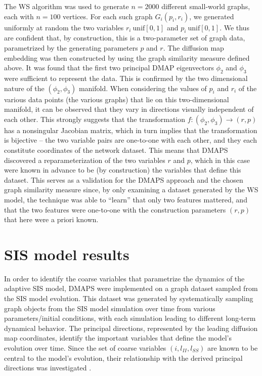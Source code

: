 The WS algorithm was used to generate $n=2000$ different small-world
graphs, each with $n=100$ vertices. For each such graph
$G_i(p_i, r_i)$, we generated uniformly at random the two variables
$r_i ~ \mathrm{unif}[0,1]$ and $p_i ~ \mathrm{unif}[0,1]$. We thus are
confident that, by construction, this is a two-parameter set of graph
data, parametrized by the generating parameters $p$ and $r$. The
diffusion map embedding was then constructed by using the graph
similarity measure defined above. It was found that the first two
principal DMAP eigenvectors $\phi_2$ and $\phi_3$ were sufficient to
represent the data. This is confirmed by the two dimensional nature of
the $(\phi_2, \phi_3)$ manifold. When considering the values of $p_i$
and $r_i$ of the various data points (the various graphs) that lie on
this two-dimensional manifold, it can be observed that they vary in
directions visually independent of each other. This strongly suggests
that the transformation $f:(\phi_2, \phi_3) \rightarrow (r,p)$ has a
nonsingular Jacobian matrix, which in turn implies that the
transformation is bijective – the two variable pairs are one-to-one
with each other, and they each constitute coordinates of the network
dataset. This means that DMAPS discovered a reparameterization of the
two variables $r$ and $p$, which in this case were known in advance to
be (by construction) the variables that define this dataset. This
serves as a validation for the DMAPS approach and the chosen graph
similarity measure since, by only examining a dataset generated by the
WS model, the technique was able to “learn” that only two features
mattered, and that the two features were one-to-one with the
construction parameters $(r, p)$ that here were a priori known.

\section{SIS model results}

In order to identify the coarse variables that parametrize the
dynamics of the adaptive SIS model, DMAPS were implemented on a graph
dataset sampled from the SIS model evolution. This dataset was
generated by systematically sampling graph objects from the SIS model
simulation over time from various parameters/initial conditions, with
each simulation leading to different long-term dynamical behavior. The
principal directions, represented by the leading diffusion map
coordinates, identify the important variables that define the model's
evolution over time. Since the set of coarse variables
$(i, l_{II}, l_{SS})$ are known to be central to the model's
evolution, their relationship with the derived principal directions
was investigated \cite{gross_robust_2008}.

